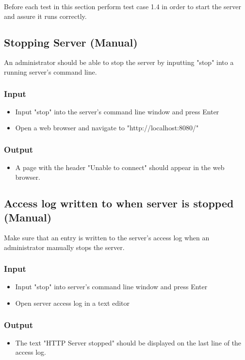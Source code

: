 \documentclass[a4paper, 12pt]{article}
\begin{document}
Before each test in this section perform test case 1.4 in order to start the server and assure it runs correctly.

\subsection{Stopping Server (Manual)}

An administrator should be able to stop the server by inputting "stop" into a running server's command line.

\subsubsection{Input}
\begin{itemize}
\item Input "stop" into the server's command line window and press Enter
\item Open a web browser and navigate to "http://localhost:8080/"
\end{itemize}

\subsubsection{Output}
\begin{itemize}
\item A page with the header "Unable to connect" should appear in the web browser.
\end{itemize}


\subsection{Access log written to when server is stopped (Manual)}

Make sure that an entry is written to the server's access log when an administrator manually stops the server.

\subsubsection{Input}
\begin{itemize}
\item Input "stop" into server's command line window and press Enter
\item Open server access log in a text editor
\end{itemize}

\subsubsection{Output}
\begin{itemize}
\item The text "HTTP Server stopped" should be displayed on the last line of the access log.
\end{itemize}
\end{document}
